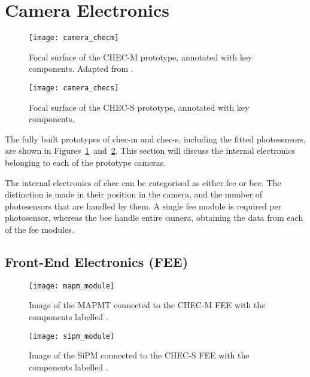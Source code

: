 \section{Camera Electronics}

\begin{figure}
	\centering
    \texttt{[image: camera\_checm]} 
	\caption[Image of the CHEC-M focal surface.]{Focal surface of the CHEC-M prototype, annotated with key components. Adapted from \textcite{Zorn2017}.}
	\label{fig:camera_checm}
\end{figure}

\begin{figure}
	\centering
    \texttt{[image: camera\_checs]} 
	\caption[Image of the CHEC-S focal surface.]{Focal surface of the CHEC-S prototype, annotated with key components.}
	\label{fig:camera_checs}
\end{figure}

The fully built prototypes of \gls{chec-m} and \gls{chec-s}, including the fitted photosensors, are shown in Figures~\ref{fig:camera_checm}~and~\ref{fig:camera_checs}. This section will discuss the internal electronics belonging to each of the prototype cameras.

The internal electronics of \gls{chec} can be categorised as either \gls{fee} or \gls{bee}. The distinction is made in their position in the camera, and the number of photosensors that are handled by them. A single \gls{fee} module is required per photosensor, whereas the \gls{bee} handle entire camera, obtaining the data from each of the \gls{fee} modules.

\subsection{Front-End Electronics (FEE)}

\begin{figure}
	\centering
    \texttt{[image: mapm\_module]} 
	\caption[Image of the MAPMT and FEE for CHEC-M.]{Image of the MAPMT connected to the CHEC-M FEE with the components labelled \cite{Zorn2017,DeFranco2016}.}
	\label{fig:mapm_module}
\end{figure}

\begin{figure}
	\centering
    \texttt{[image: sipm\_module]} 
	\caption[Image of the SiPM and FEE for CHEC-S.]{Image of the SiPM connected to the CHEC-S FEE with the components labelled \cite{White2017}.}
	\label{fig:sipm_module}
\end{figure}

